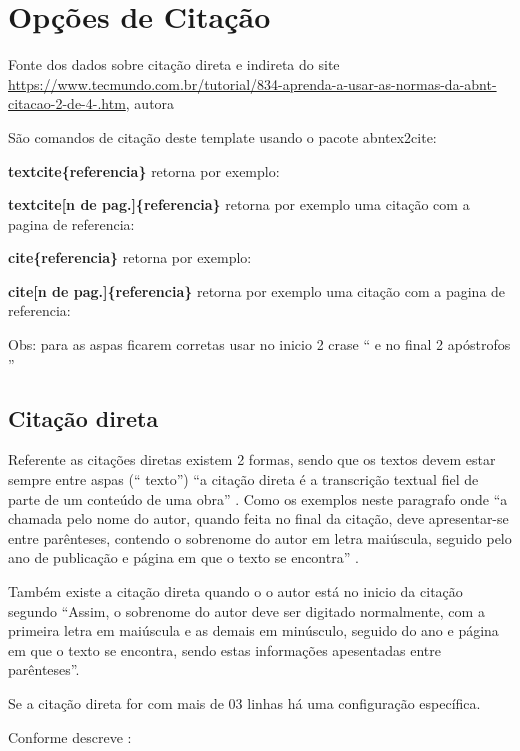 \section{Opções de Citação}
\label{sec:citacoes}

Fonte dos dados sobre citação direta e indireta do site \url{https://www.tecmundo.com.br/tutorial/834-aprenda-a-usar-as-normas-da-abnt-citacao-2-de-4-.htm}, autora \textcite{xavier2020}

São comandos de citação deste template usando o pacote abntex2cite:

\textbf{textcite\{referencia\}} retorna por exemplo: \textcite{kitchenham2009systematic}

\textbf{textcite[n de pag.]\{referencia\}}  retorna por exemplo uma citação com a pagina de referencia: \textcite[p.20]{kitchenham2009systematic}

\textbf{cite\{referencia\}} retorna por exemplo: \cite{kitchenham2009systematic}

\textbf{cite[n de pag.]\{referencia\}}  retorna por exemplo uma citação com a pagina de referencia: \cite[p.20]{kitchenham2009systematic}

Obs: para as aspas ficarem corretas usar no inicio 2 crase `` e no final 2 apóstrofos ''

\subsection{Citação direta}

Referente as citações diretas existem 2 formas, sendo que os textos devem estar sempre entre aspas (``  texto'') ``a citação direta é a transcrição textual fiel de parte de um conteúdo de uma obra''  \cite{xavier2020}. Como os exemplos neste paragrafo onde ``a chamada pelo nome do autor, quando feita no final da citação, deve apresentar-se entre parênteses, contendo o sobrenome do autor em letra maiúscula, seguido pelo ano de publicação e página em que o texto se encontra'' \cite{xavier2020}. 

Também existe a citação direta quando o o autor está no inicio da citação segundo \textcite{xavier2020} ``Assim, o sobrenome do autor deve ser digitado normalmente, com a primeira letra em maiúscula e as demais em minúsculo, seguido do ano e página em que o texto se encontra, sendo estas informações apesentadas entre parênteses''.


Se a citação direta for com mais de 03 linhas há uma configuração específica.

Conforme descreve \textcite{xavier2020}:

